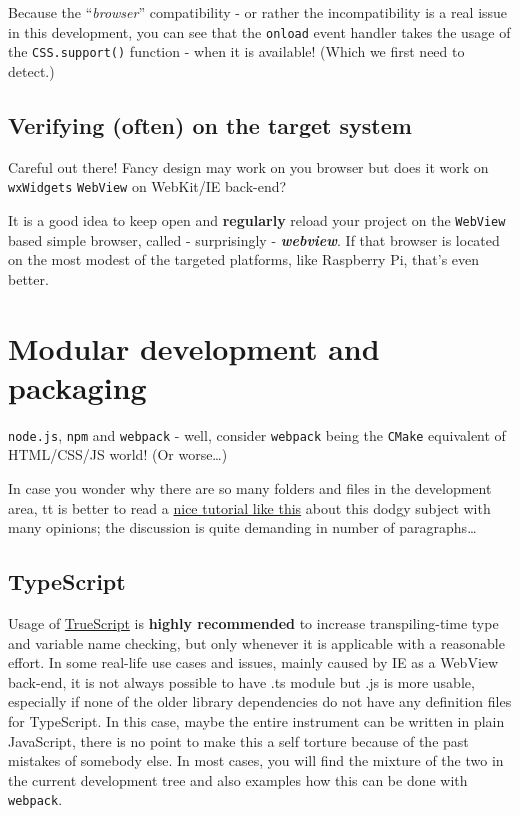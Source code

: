 \documentclass[11pt]{article}
\begin{document}
    Because the ``\emph{browser}'' compatibility - or rather the
incompatibility is a real issue in this development, you can see that
the \texttt{onload} event handler takes the usage of the
\texttt{CSS.support()} function - when it is available! (Which we first
need to detect.)

    \hypertarget{verifying-often-on-the-target-system}{%
\subsection{Verifying (often) on the target
system}\label{verifying-often-on-the-target-system}}

    Careful out there! Fancy design may work on you browser but does it work
on \texttt{wxWidgets} \texttt{WebView} on WebKit/IE back-end?

    It is a good idea to keep open and \textbf{regularly} reload your
project on the \texttt{WebView} based simple browser, called -
surprisingly - \textbf{\emph{webview}}. If that browser is located on
the most modest of the targeted platforms, like Raspberry Pi, that's
even better.

    \hypertarget{modular-development-and-packaging}{%
\section{Modular development and
packaging}\label{modular-development-and-packaging}}

    \texttt{node.js}, \texttt{npm} and \texttt{webpack} - well, consider
\texttt{webpack} being the \texttt{CMake} equivalent of HTML/CSS/JS
world! (Or worse\ldots)

    In case you wonder why there are so many folders and files in the
development area, tt is better to read a
\href{https://medium.com/dev-bits/everything-i-know-about-writing-modular-javascript-applications-37c125d8eddf}{nice
tutorial like this} about this dodgy subject with many opinions; the
discussion is quite demanding in number of paragraphs\ldots{}

    \hypertarget{typescript}{%
\subsection{TypeScript}\label{typescript}}

    Usage of \href{https://www.typescriptlang.org/}{TrueScript} is
\textbf{highly recommended} to increase transpiling-time type and
variable name checking, but only whenever it is applicable with a
reasonable effort. In some real-life use cases and issues, mainly caused
by IE as a WebView back-end, it is not always possible to have .ts
module but .js is more usable, especially if none of the older library
dependencies do not have any definition files for TypeScript. In this
case, maybe the entire instrument can be written in plain JavaScript,
there is no point to make this a self torture because of the past
mistakes of somebody else. In most cases, you will find the mixture of
the two in the current development tree and also examples how this can
be done with \texttt{webpack}.
\end{document}
